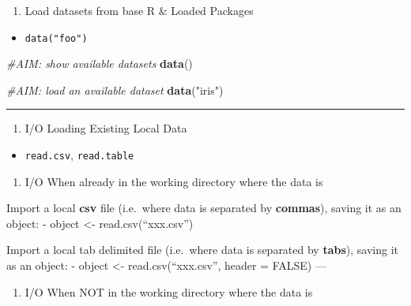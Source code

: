 \documentclass[]{book}
\newenvironment{Shaded}{\begin{snugshade}}{\end{snugshade}}
\newcommand{\CommentTok}[1]{\textcolor[rgb]{0.56,0.35,0.01}{\textit{#1}}}
\newcommand{\KeywordTok}[1]{\textcolor[rgb]{0.13,0.29,0.53}{\textbf{#1}}}
\newcommand{\NormalTok}[1]{#1}
\newcommand{\StringTok}[1]{\textcolor[rgb]{0.31,0.60,0.02}{#1}}
\providecommand{\tightlist}{%
  \setlength{\itemsep}{0pt}\setlength{\parskip}{0pt}}
\begin{document}
\begin{enumerate}
\def\labelenumi{\arabic{enumi}.}
\setcounter{enumi}{4}
\tightlist
\item
  Load datasets from base R \& Loaded Packages
\end{enumerate}

\begin{itemize}
\tightlist
\item
  \texttt{data("foo")}
\end{itemize}

\begin{Shaded}
\begin{Highlighting}[]
\CommentTok{#AIM: show available datasets}
\KeywordTok{data}\NormalTok{() }

\CommentTok{#AIM: load an available dataset}
\KeywordTok{data}\NormalTok{(}\StringTok{"iris"}\NormalTok{) }
\end{Highlighting}
\end{Shaded}

\begin{center}\rule{0.5\linewidth}{0.5pt}\end{center}

\begin{enumerate}
\def\labelenumi{\arabic{enumi}.}
\setcounter{enumi}{5}
\tightlist
\item
  I/O Loading Existing Local Data
\end{enumerate}

\begin{itemize}
\tightlist
\item
  \texttt{read.csv}, \texttt{read.table}
\end{itemize}

\begin{enumerate}
\def\labelenumi{(\alph{enumi})}
\tightlist
\item
  I/O When already in the working directory where the data is
\end{enumerate}

Import a local \textbf{csv} file (i.e.~where data is separated by \textbf{commas}), saving it as an object:
- object \textless{}- read.csv(``xxx.csv'')

Import a local tab delimited file (i.e.~where data is separated by \textbf{tabs}), saving it as an object:
- object \textless{}- read.csv(``xxx.csv'', header = FALSE)
---

\begin{enumerate}
\def\labelenumi{(\alph{enumi})}
\setcounter{enumi}{1}
\tightlist
\item
  I/O When NOT in the working directory where the data is
\end{enumerate}
\end{document}
